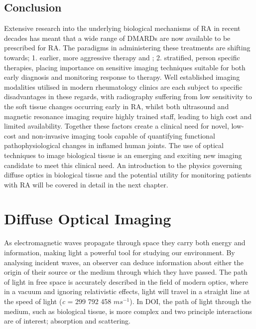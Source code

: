 \documentclass[twoside]{bhamthesis}
\theoremstyle{definition}
\begin{document}
\section{Conclusion}

Extensive research into the underlying biological mechanisms of RA in recent decades has meant that a wide range of DMARDs are now available to be prescribed for RA. The paradigms in administering these treatments are shifting towards; 1. earlier, more aggressive therapy and ; 2. stratified, person specific therapies, placing importance on sensitive imaging techniques suitable for both early diagnosis and monitoring response to therapy. Well established imaging modalities utilised in modern rheumatology clinics are each subject to specific disadvantages in these regards, with radiography suffering from low sensitivity to the soft tissue changes occurring early in RA, whilst both ultrasound and magnetic resonance imaging require highly trained staff, leading to high cost and limited availability. Together these factors create a clinical need for novel, low-cost and non-invasive imaging tools capable of quantifying functional pathophysiological changes in inflamed human joints. The use of optical techniques to image biological tissue is an emerging and exciting new  imaging candidate to meet this clinical need. An introduction to the physics governing diffuse optics in biological tissue and the potential utility for monitoring patients with RA will be covered in detail in the next chapter.

\chapter{Diffuse Optical Imaging}
\label{chapter:DOI}

As electromagnetic waves propagate through space they carry both energy and information, making light a powerful tool for studying our environment. By analysing incident waves, an observer can deduce information about either the origin of their source or the medium through which they have passed. The path of light in free space is accurately described in the field of modern optics, where in a vacuum and ignoring relativistic effects, light will travel in a straight line at the speed of light (\textit{c} = 299 792 458 $ms^{-1}$). In DOI, the path of light through the medium, such as biological tissue, is more complex and two principle interactions are of interest; absorption and scattering. 
\end{document}
